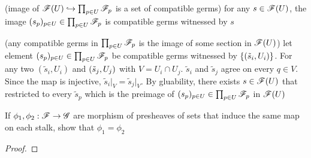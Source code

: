 \begin{longproof}
	(image of $\mathscr{F}(U) \hookrightarrow \prod_{p \in U} \mathscr{F}_p$ is a set of compatible germs) for any $s \in \mathscr{F}(U)$, the image $(s_p)_{p \in U} \in \prod_{p \in U} \mathscr{F}_p$ is compatible germs witnessed by $s$
	
	(any compatible germs in $\prod_{p \in U} \mathscr{F}_p$ is the image of some section in $\mathscr{F}(U)$) let element $(s_p)_{p \in U} \in \prod_{p \in U} \mathscr{F}_p$ be compatible germs witnessed by $\{(\tilde{s}_i, U_i)\}$. For any two $(\tilde{s}_i, U_i)$ and $(\tilde{s}_j, U_j)$ with $V = U_i \cap U_j$. $\tilde{s}_i$ and $\tilde{s}_j$ agree on every $q \in V$. Since the map is injective, $\tilde{s}_i \vert_{V} = \tilde{s}_j \vert_V$. By gluability, there exists $s \in \mathscr{F}(U)$ that restricted to every $\tilde{s}_p$ which is the preimage of $(s_p)_{p \in U} \in \prod_{p \in U} \mathscr{F}_p$ in $\mathscr{F}(U)$
\end{longproof}


\begin{proposition}
	If $\phi_1, \phi_2: \mathscr{F} \to \mathscr{G}$ are morphism of presheaves of sets that induce the same map on each stalk, show that $\phi_1 = \phi_2$
\end{proposition}

\begin{proof}
\end{proof}